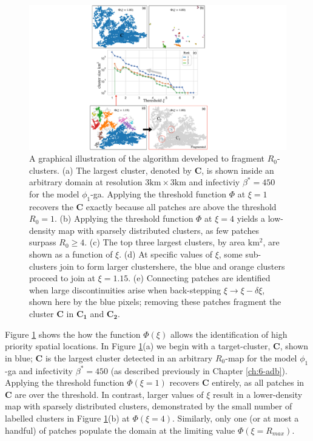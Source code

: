 \begin{figure}
    \centering
    \includegraphics[scale=0.5]{chapter7/figures/figure1-frag-method.pdf}
    \caption{
    A graphical illustration of the algorithm developed to fragment $R_0$-clusters.  
    (a) The largest cluster, denoted by $\mathbf{C}$, is shown inside an arbitrary domain at resolution $3\mathrm{km} \times 3 \mathrm{km}$ and infectiviy $\beta^*=450$ for the model $\phi_1$-ga.
    Applying the threshold function $\Phi$ at $\xi=1$ recovers the $\mathbf{C}$ exactly because all patches are above the threshold $R_0=1$.
    (b) Applying the threshold function $\Phi$ at $\xi=4$ yields a low-density map with sparsely distributed clusters, as few patches surpass $R_0\geq 4$. 
    (c) The top three largest clusters, by area $\mathrm{km^2}$, are shown as a function of $\xi$.
    (d) At specific values of $\xi$, some sub-clusters join to form larger clusters\textemdash here, the blue and orange clusters proceed to join at $\xi = 1.15$.
    (e) Connecting patches are identified when large discontinuities arise when back-stepping $\xi \rightarrow \xi -\delta \xi$, shown here by the blue pixels; removing these patches fragment the cluster $\mathbf{C}$ in $\mathbf{C_1}$ and $\mathbf{C_2}$. 
    }
    \label{fig:R0-threshold-function}
\end{figure}

Figure \ref{fig:R0-threshold-function} shows the how the function $\Phi(\xi)$ allows the identification of high priority spatial locations.
In Figure \ref{fig:R0-threshold-function}(a) we begin with a target-cluster, $\mathbf{C}$, shown in blue;
$\mathbf{C}$ is the largest cluster detected in an arbitrary $R_0$-map for the model $\phi_1$-ga and infectivity $\beta^*=450$ (as described previously in Chapter \ref{ch:6-adb}).
Applying the threshold function $\Phi(\xi=1)$ recovers $\mathbf{C}$ entirely, as all patches in $\mathbf{C}$ are over the threshold.
In contrast, larger values of $\xi$ result in a lower-density map with sparsely distributed clusters, 
demonstrated by the small number of labelled clusters in Figure \ref{fig:R0-threshold-function}(b) at $\Phi(\xi=4)$.
Similarly, only one (or at most a handful) of patches populate the domain at the limiting value $\Phi(\xi=R_{max})$.

